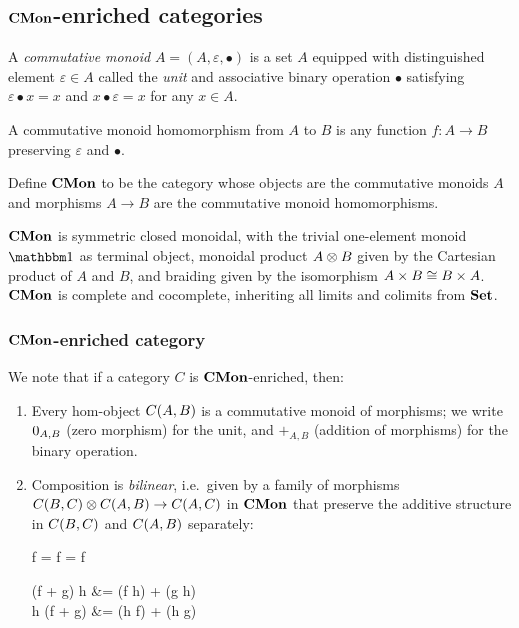 \subsection{$\mathbf{CMon}$-enriched categories}
\label{sec:cmon-enriched}

\begin{definition}
A \emph{commutative monoid} $A = (A, \varepsilon, \bullet)$ is a set $A$ equipped with distinguished element
$\varepsilon \in A$ called the \emph{unit} and associative binary operation $\bullet$ satisfying $\varepsilon
\bullet x = x$ and $x \bullet \varepsilon = x$ for any $x \in A$.
\end{definition}

A commutative monoid homomorphism from $A$ to $B$ is any function $f: A \to B$ preserving $\varepsilon$ and
$\bullet$.

\begin{definition}
Define $\mathbf{CMon}$ to be the category whose objects are the commutative monoids $A$ and morphisms $A \to B$ are
the commutative monoid homomorphisms.
\end{definition}

$\mathbf{CMon}$ is symmetric closed monoidal, with the trivial one-element monoid $\One$ as terminal object, monoidal
product $A \otimes B$ given by the Cartesian product of $A$ and $B$, and braiding given by the isomorphism $A
\times B \cong B \times A$. $\mathbf{CMon}$ is complete and cocomplete, inheriting all limits and colimits from $\mathbf{Set}$.

\subsubsection{$\mathbf{CMon}$-enriched category}

We note that if a category $C$ is $\mathbf{CMon}$-enriched, then:
\begin{enumerate}
\item Every hom-object ${C}(A,B)$ is a commutative monoid of morphisms; we write $0_{A,B}$ (zero
morphism) for the unit, and $+_{A,B}$ (addition of morphisms) for the binary operation.
\item Composition is \emph{bilinear}, i.e.~given by a family of morphisms ${C}(B,C) \otimes
{C}(A,B) \to {C}(A,C)$ in $\mathbf{CMon}$ that preserve the additive structure in ${C}(B,C)$ and
${C}(A,B)$ separately:

\begin{salign*}
f \comp \zero = f = \zero \comp f
\end{salign*}
\begin{salign*}
(f + g) \comp h &= (f \comp h) + (g \comp h) \\
h \comp (f + g) &= (h \comp f) + (h \comp g)
\end{salign*}
\end{enumerate}

